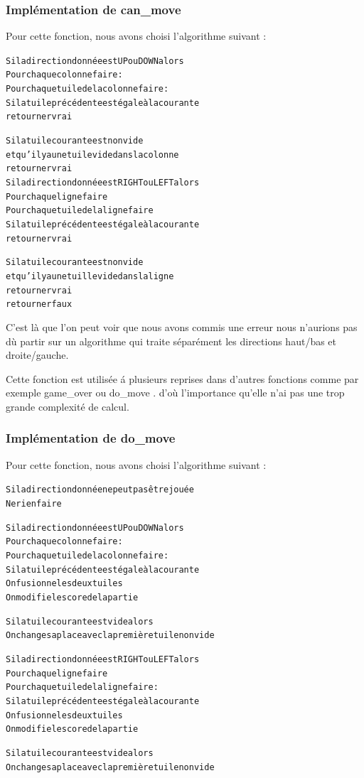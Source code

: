 \documentclass[12pt]{article}
\begin{document}
\subsubsection{Implémentation de \og can\_move \fg{}}
Pour cette fonction, nous avons choisi l'algorithme suivant :

\begin{alltt}
{\color{gray}
Si la direction donn\'ee est \og UP \fg{} ou \og DOWN \fg{} alors
    Pour chaque colonne faire :
        Pour chaque tuile de la colonne faire :
            Si la tuile pr\'ec\'edente est \'egale \`a la courante
                retourner vrai
 		
            Si la tuile courante est non vide 
                   et qu'il y a une tuile vide dans la colonne
                retourner vrai	    	
Si la direction donn\'ee est \og RIGHT \fg{} ou \og LEFT \fg{} alors
    Pour chaque ligne faire 
        Pour chaque tuile de la ligne faire
            Si la tuile pr\'ec\'edente est \'egale \`a la courante
                retourner vrai
 		
            Si la tuile courante est non vide
                   et qu'il y a une tuille vide dans la ligne
                retourner vrai	    	
retourner faux
}
\end{alltt}

C'est là que l'on peut voir que nous avons commis une erreur nous n'aurions
pas dù partir sur un algorithme qui traite séparément les directions haut/bas et droite/gauche.

Cette fonction est utilis\'ee \'a plusieurs reprises dans d'autres fonctions
comme par exemple \og game\_over \fg{} ou \og do\_move \fg{}. d'o\`u
l'importance qu'elle n'ai pas une trop grande complexit\'e de calcul.

\subsubsection{Implémentation de \og do\_move \fg{}}
Pour cette fonction, nous avons choisi l'algorithme suivant :
\begin{alltt}
{\color{gray}
Si la direction donn\'ee ne peut pas \^etre jouée
    Ne rien faire
     
Si la direction donn\'ee est \og UP \fg{} ou \og DOWN \fg{} alors
    Pour chaque colonne faire :
        Pour chaque tuile de la colonne faire :
            Si la tuile pr\'ec\'edente est \'egale \`a la courante
                On fusionne les deux tuiles
                On modifie le score de la partie
            
            Si la tuile courante est vide alors
            	On change sa place avec la premi\`ere tuile non vide
            	
Si la direction donn\'ee est \og RIGHT \fg{} ou \og LEFT \fg{} alors
    Pour chaque ligne faire 
        Pour chaque tuile de la ligne faire :
            Si la tuile pr\'ec\'edente est \'egale \`a la courante
                On fusionne les deux tuiles
                On modifie le score de la partie
            
            Si la tuile courante est vide alors
            	On change sa place avec la premi\`ere tuile non vide
}
\end{alltt}
\end{document}
